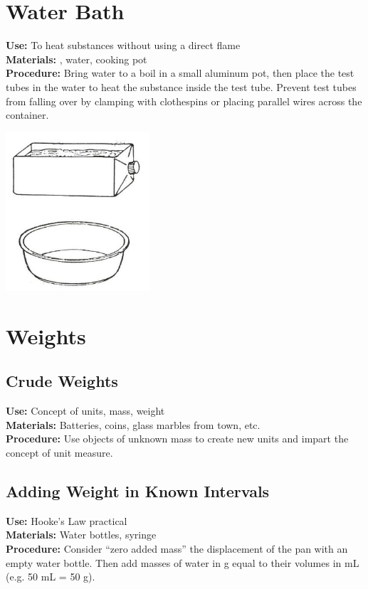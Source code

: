 \begin{multicols}{2}
\section{Water Bath} 
\label{sec:hotwaterbathes}
\vspace{-10pt}
\textbf{Use:} To heat substances without using a direct flame\\
\textbf{Materials:} , water, cooking pot\\
\textbf{Procedure:} Bring water to a boil in a small aluminum pot, then place the test tubes in the water to heat the substance inside the test tube. Prevent test tubes from falling over by clamping with clothespins or placing parallel wires across the container.
\begin{center}
\includegraphics[width=0.4\textwidth]{./img/source/trough.jpg}
\end{center}

\section{Weights} 
\label{sec:weights}

\subsection{Crude Weights}
\vspace{-6pt}
\textbf{Use:} Concept of units, mass, weight\\
\textbf{Materials:} Batteries, coins, glass marbles from town, etc. \\
\textbf{Procedure:} Use objects of unknown mass to create new units and impart the concept of unit measure.

\subsection{Adding Weight in Known Intervals} 
\vspace{-6pt}
\textbf{Use:} Hooke's Law practical\\
\textbf{Materials:} Water bottles, syringe\\
\textbf{Procedure:} Consider ``zero added mass'' the displacement of the pan with an empty water bottle. Then add masses of water in g equal to their volumes in mL (e.g. 50 mL = 50 g).


\end{multicols}
